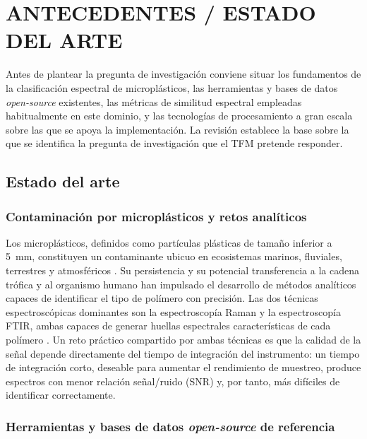 \chapter{ANTECEDENTES / ESTADO DEL ARTE}

Antes de plantear la pregunta de investigación conviene situar los fundamentos de la clasificación espectral de microplásticos, las herramientas y bases de datos \textit{open-source} existentes, las métricas de similitud espectral empleadas habitualmente en este dominio, y las tecnologías de procesamiento a gran escala sobre las que se apoya la implementación. La revisión establece la base sobre la que se identifica la pregunta de investigación que el TFM pretende responder.

\section{Estado del arte}

\subsection{Contaminación por microplásticos y retos analíticos}

Los microplásticos, definidos como partículas plásticas de tamaño inferior a 5~mm, constituyen un contaminante ubicuo en ecosistemas marinos, fluviales, terrestres y atmosféricos \citep{cole2011microplastics}. Su persistencia y su potencial transferencia a la cadena trófica y al organismo humano \citep{hernandez2017microplastics} han impulsado el desarrollo de métodos analíticos capaces de identificar el tipo de polímero con precisión. Las dos técnicas espectroscópicas dominantes son la espectroscopía Raman y la espectroscopía FTIR, ambas capaces de generar huellas espectrales características de cada polímero \citep{araujo2018raman, schymanski2021microplastics}. Un reto práctico compartido por ambas técnicas es que la calidad de la señal depende directamente del tiempo de integración del instrumento: un tiempo de integración corto, deseable para aumentar el rendimiento de muestreo, produce espectros con menor relación señal/ruido (SNR) y, por tanto, más difíciles de identificar correctamente.

\subsection{Herramientas y bases de datos \textit{open-source} de referencia}

